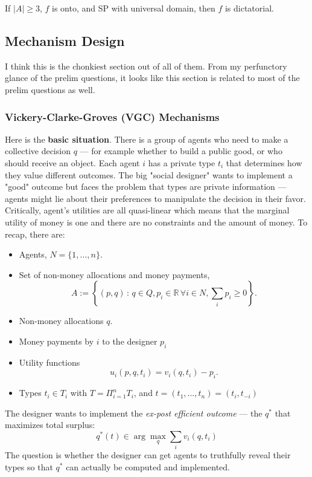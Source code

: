 \documentclass[11pt,english]{article}
\begin{document}
\begin{theorem}
If $|A| \geq 3$, $f$ is onto, and SP with universal domain, then $f$ is dictatorial.
\end{theorem}

\subsection{Mechanism Design}
I think this is the chonkiest section out of all of them. From my perfunctory glance of the prelim questions, it looks like this section is related to most of the prelim questions as well.

\subsubsection{Vickery-Clarke-Groves (VGC) Mechanisms}
Here is the \textbf{basic situation}. There is a group of agents who need to make a collective decision $q$ — for example whether to build a public good, or who should receive an object. Each agent $i$ has a private type $t_i$ that determines how they value different outcomes. The big "social designer" wants to implement a "good" outcome but faces the problem that types are private information — agents might lie about their preferences to manipulate the decision in their favor. Critically, agent's utilities are all quasi-linear which means that the marginal utility of money is one and there are no constraints and the amount of money. To recap, there are:
\begin{itemize}
\item Agents, $N = \{1, \ldots, n\}$.
\item Set of non-money allocations and money payments, $$A := \left\{(p,q)\,:\,q\in Q, p_i\in \mathbb{R}\,\forall i\in N,\sum_{i}p_i \geq 0\right\}.$$
\item Non-money allocations $q$.
\item Money payments by $i$ to the designer $p_i$
\item Utility functions $$u_i(p,q,t_i) = v_i(q, t_i) - p_i.$$
\item Types $t_i\in T_i$ with $T = \Pi_{i=1}^nT_i$, and $t = (t_1, \ldots, t_n) = (t_i, t_{-i})$
\end{itemize}
The designer wants to implement the \textit{ex-post efficient outcome} --- the $q^*$ that maximizes total surplus:
\begin{equation}
    q^*(t) \in \arg\max_q \sum_i v_i(q, t_i)
\end{equation}
The question is whether the designer can get agents to truthfully reveal their types so that $q^*$ can actually be computed and implemented. 
\end{document}
